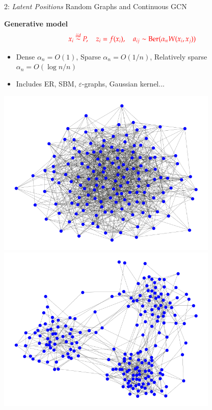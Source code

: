 \documentclass[final,dvipsnames]{beamer}
\newcommand{\vsp}{\vspace{10pt}}
\begin{document}
\begin{frame}{}
\begin{columns}[t]
\begin{column}{0.45\linewidth}
\begin{block}{2: \emph{Latent Positions} Random Graphs and Continuous GCN}
\begin{table}
\parbox{\textwidth}{\vsp \vsp
\textbf{Generative model}
\begin{equation*}
{\color{red}  x_i \stackrel{iid}{\sim} P, \quad  z_{i} = f(x_i), \quad a_{ij} \sim \operatorname{Ber}(\alpha_n W(x_i, x_j))}
\end{equation*}
%
\normalsize
\begin{itemize}
\item Dense $\alpha_n =O(1)$, Sparse $\alpha_n = O(1/n)$, \alert{Relatively sparse} $\alpha_n = O(\log n/n)$
\item Includes ER, SBM, $\varepsilon$-graphs, Gaussian kernel...
\end{itemize}
\begin{center}
\includegraphics[height=8cm]{img/ex_ER.png}\quad
\includegraphics[height=8cm]{img/ex_SBM.png}\quad

\end{center}}
\end{table}
\end{block}
\end{column}
\end{columns}
\end{frame}
\end{document}

